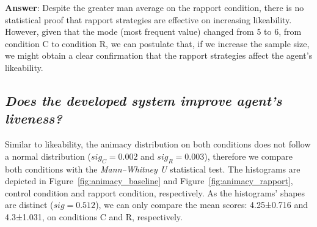 \textbf{Answer}: Despite the greater man average on the rapport condition, there is no statistical proof that rapport strategies are effective on increasing likeability. However, given that the mode (most frequent value) changed from 5 to 6, from condition C to condition R, we can postulate that, if we increase the sample size, we might obtain a clear confirmation that the rapport strategies affect the agent's likeability.

\subsection*{\textit{Does the developed system improve agent's liveness?}}

Similar to likeability, the animacy distribution on both conditions does not follow a normal distribution ($sig_C=0.002$ and $sig_R=0.003$), therefore we compare both conditions with the \textit{Mann–Whitney U} statistical test. The histograms are depicted in Figure~\ref{fig:animacy_baseline} and Figure~\ref{fig:animacy_rapport}, control condition and rapport condition, respectively. As the histograms' shapes are distinct ($sig=0.512$), we can only compare the mean scores: 4.25±0.716 and 4.3±1.031, on conditions C and R, respectively.

